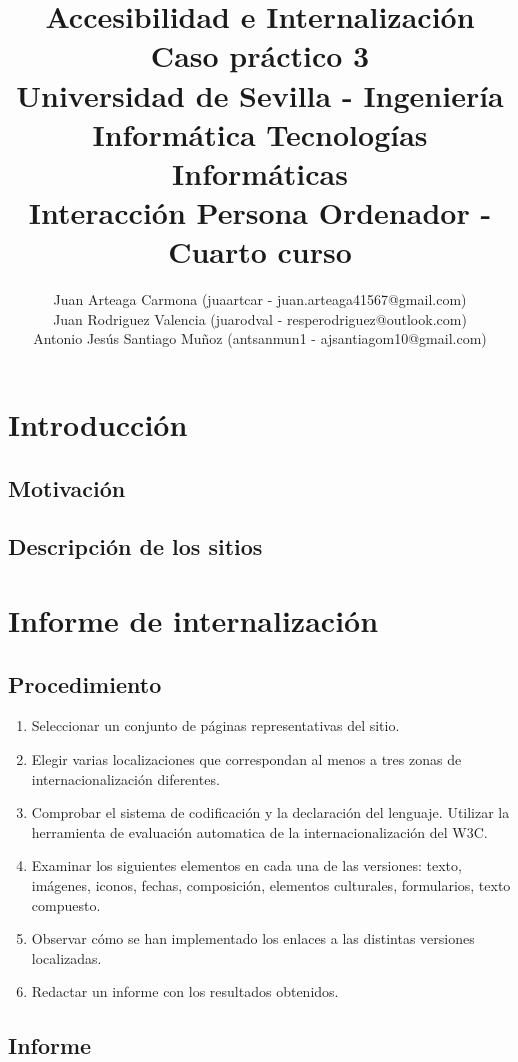 \documentclass[a4paper,11pt]{article}
\title{
        \textbf{Accesibilidad e Internalización}\large\\
        \textbf{Caso práctico 3}\\
        \medskip
        Universidad de Sevilla - Ingeniería Informática Tecnologías Informáticas\\
        Interacción Persona Ordenador - Cuarto curso}
\author{Juan Arteaga Carmona (juaartcar - juan.arteaga41567@gmail.com)\\
        Juan Rodriguez Valencia (juarodval - resperodriguez@outlook.com)\\
        Antonio Jesús Santiago Muñoz (antsanmun1 - ajsantiagom10@gmail.com)\\
}
\begin{document}
\maketitle

\newpage
\tableofcontents
\listoffigures
\newpage


\section{Introducción}
\subsection{Motivación}
\subsection{Descripción de los sitios}

\section{Informe de internalización}
\subsection{Procedimiento}
\begin{enumerate}
  \item Seleccionar un conjunto de páginas representativas del sitio.
  \item Elegir varias localizaciones que correspondan al menos a tres zonas de internacionalización diferentes.
  \item Comprobar el sistema de codificación y la declaración del lenguaje. Utilizar la herramienta de evaluación automatica de la internacionalización del W3C. \cite{w3cinter}
  \item Examinar los siguientes elementos en cada una de las versiones: texto, imágenes, iconos, fechas, composición, elementos culturales, formularios, texto compuesto.
  \item Observar cómo se han implementado los enlaces a las distintas versiones localizadas.
  \item Redactar un informe con los resultados obtenidos.
\end{enumerate}


\subsection{Informe}
\end{document}
